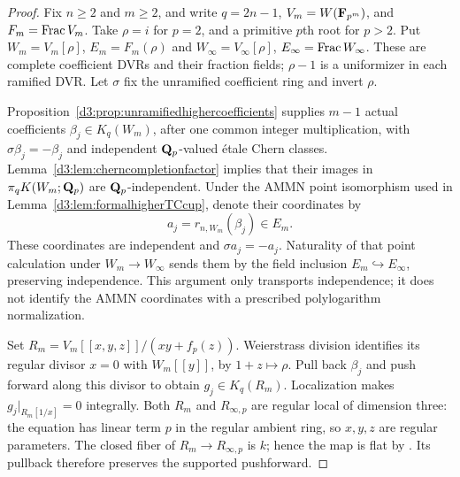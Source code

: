 \begin{proof}
Fix $n\geq2$ and $m\geq2$, and write $q=2n-1$,
$V_m=W(\mathbf F_{p^m})$, and $F_m=\operatorname{Frac} V_m$.
Take $\rho=i$ for $p=2$, and a primitive $p$th root for $p>2$.
Put $W_m=V_m[\rho]$, $E_m=F_m(\rho)$ and
$W_\infty=V_\infty[\rho]$, $E_\infty=\operatorname{Frac} W_\infty$.
These are complete coefficient DVRs and their fraction fields;
$\rho-1$ is a uniformizer in each ramified DVR.
Let $\sigma$ fix the unramified coefficient ring and invert $\rho$.

Proposition~\ref{d3:prop:unramifiedhighercoefficients} supplies
$m-1$ actual coefficients $\beta_j\in K_q(W_m)$, after one
common integer multiplication, with $\sigma\beta_j=-\beta_j$
and independent $\mathbf Q_p$-valued \'etale Chern classes.
Lemma~\ref{d3:lem:cherncompletionfactor} implies that their images
in $\pi_qK(W_m;\mathbf Q_p)$ are $\mathbf Q_p$-independent.
Under the AMMN point isomorphism used in
Lemma~\ref{d3:lem:formalhigherTCcup}, denote their coordinates by
\[
 a_j=r_{n,W_m}(\beta_j)\in E_m.
\]
These coordinates are independent and $\sigma a_j=-a_j$.
Naturality of that point calculation under $W_m\to W_\infty$
sends them by the field inclusion $E_m\hookrightarrow E_\infty$,
preserving independence. This argument only transports independence;
it does not identify the AMMN coordinates with a prescribed
polylogarithm normalization.

Set $R_m=V_m[[x,y,z]]/(xy+f_p(z))$.
Weierstrass division identifies its regular divisor $x=0$ with
$W_m[[y]]$, by $1+z\mapsto\rho$.
Pull back $\beta_j$ and push forward along this divisor to obtain
$g_j\in K_q(R_m)$. Localization makes $g_j|_{R_m[1/x]}=0$
integrally.
Both $R_m$ and $R_{\infty,p}$ are regular local of dimension three:
the equation has linear term $p$ in the regular ambient ring,
so $x,y,z$ are regular parameters.
The closed fiber of $R_m\to R_{\infty,p}$ is $k$; hence the map
is flat by \cite[Tag~00R4]{StacksFlatness}.
Its pullback therefore preserves the supported pushforward.


\end{proof}
